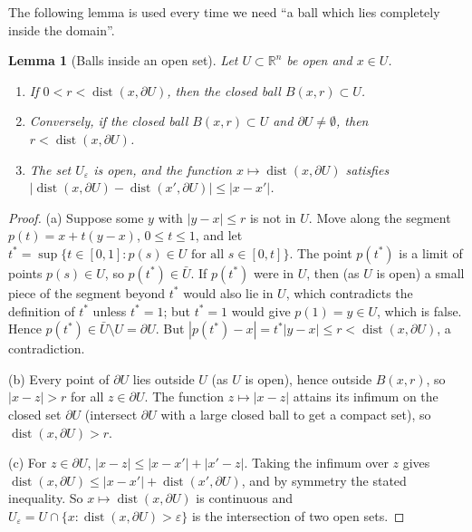 \documentclass[11pt]{article}
\theoremstyle{plain}
\newtheorem{lemma}[theorem]{Lemma}
\theoremstyle{definition}
\theoremstyle{remark}
\begin{document}
The following lemma is used every time we need ``a ball which lies completely inside the domain''.

\begin{lemma}[Balls inside an open set]\label{lem:balls}
Let $U \subset \mathbb{R}^n$ be open and $x \in U$.
\begin{enumerate}
    \item[(a)] If $0 < r < \operatorname{dist}(x, \partial U)$, then the closed ball $B(x,r) \subset U$.
    \item[(b)] Conversely, if the closed ball $B(x,r) \subset U$ and $\partial U \neq \emptyset$, then $r < \operatorname{dist}(x, \partial U)$.
    \item[(c)] The set $U_\varepsilon$ is open, and the function $x \mapsto \operatorname{dist}(x,\partial U)$ satisfies $|\operatorname{dist}(x,\partial U) - \operatorname{dist}(x',\partial U)| \leq |x - x'|$.
\end{enumerate}
\end{lemma}
\begin{proof}
(a) Suppose some $y$ with $|y - x| \leq r$ is not in $U$. Move along the segment $p(t) = x + t(y-x)$, $0 \le t \le 1$, and let $t^* = \sup\{ t \in [0,1] : p(s) \in U \text{ for all } s \in [0,t] \}$. The point $p(t^*)$ is a limit of points $p(s) \in U$, so $p(t^*) \in \bar U$. If $p(t^*)$ were in $U$, then (as $U$ is open) a small piece of the segment beyond $t^*$ would also lie in $U$, which contradicts the definition of $t^*$ unless $t^* = 1$; but $t^*=1$ would give $p(1) = y \in U$, which is false. Hence $p(t^*) \in \bar U \setminus U = \partial U$. But $|p(t^*) - x| = t^*|y - x| \leq r < \operatorname{dist}(x,\partial U)$, a contradiction.

(b) Every point of $\partial U$ lies outside $U$ (as $U$ is open), hence outside $B(x,r)$, so $|x - z| > r$ for all $z \in \partial U$. The function $z \mapsto |x-z|$ attains its infimum on the closed set $\partial U$ (intersect $\partial U$ with a large closed ball to get a compact set), so $\operatorname{dist}(x,\partial U) > r$.

(c) For $z \in \partial U$, $|x - z| \leq |x - x'| + |x' - z|$. Taking the infimum over $z$ gives $\operatorname{dist}(x,\partial U) \leq |x - x'| + \operatorname{dist}(x',\partial U)$, and by symmetry the stated inequality. So $x \mapsto \operatorname{dist}(x,\partial U)$ is continuous and $U_\varepsilon = U \cap \{ x : \operatorname{dist}(x,\partial U) > \varepsilon\}$ is the intersection of two open sets.
\end{proof}
\end{document}

